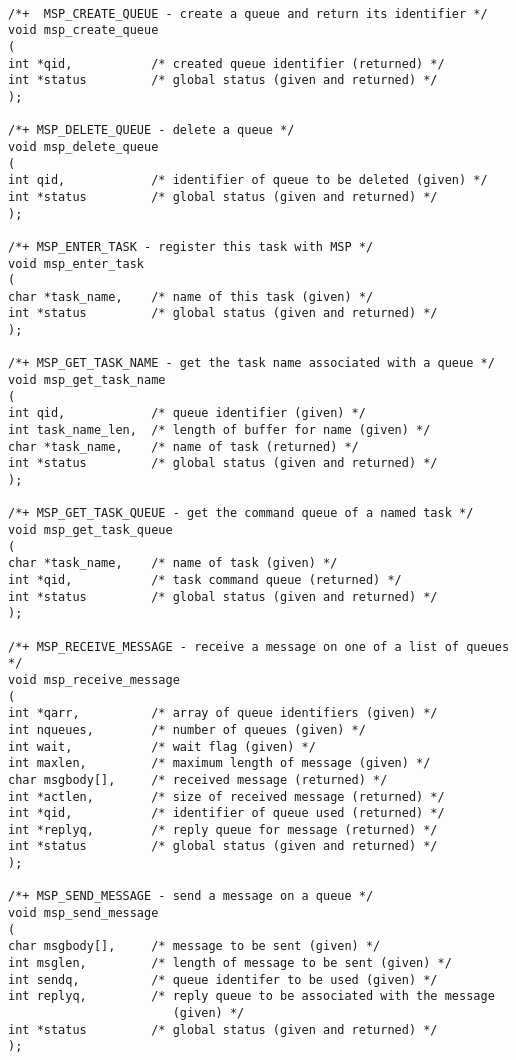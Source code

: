 \begin{verbatim}

/*+  MSP_CREATE_QUEUE - create a queue and return its identifier */
void msp_create_queue
(
int *qid,           /* created queue identifier (returned) */
int *status         /* global status (given and returned) */
);

/*+ MSP_DELETE_QUEUE - delete a queue */
void msp_delete_queue
(
int qid,            /* identifier of queue to be deleted (given) */
int *status         /* global status (given and returned) */
);

/*+ MSP_ENTER_TASK - register this task with MSP */
void msp_enter_task
(
char *task_name,    /* name of this task (given) */
int *status         /* global status (given and returned) */
);

/*+ MSP_GET_TASK_NAME - get the task name associated with a queue */
void msp_get_task_name
(
int qid,            /* queue identifier (given) */
int task_name_len,  /* length of buffer for name (given) */
char *task_name,    /* name of task (returned) */
int *status         /* global status (given and returned) */
);

/*+ MSP_GET_TASK_QUEUE - get the command queue of a named task */
void msp_get_task_queue
(
char *task_name,    /* name of task (given) */
int *qid,           /* task command queue (returned) */
int *status         /* global status (given and returned) */
);

/*+ MSP_RECEIVE_MESSAGE - receive a message on one of a list of queues */
void msp_receive_message
(
int *qarr,          /* array of queue identifiers (given) */
int nqueues,        /* number of queues (given) */
int wait,           /* wait flag (given) */
int maxlen,         /* maximum length of message (given) */
char msgbody[],     /* received message (returned) */
int *actlen,        /* size of received message (returned) */
int *qid,           /* identifier of queue used (returned) */
int *replyq,        /* reply queue for message (returned) */
int *status         /* global status (given and returned) */
);

/*+ MSP_SEND_MESSAGE - send a message on a queue */
void msp_send_message
(
char msgbody[],     /* message to be sent (given) */
int msglen,         /* length of message to be sent (given) */
int sendq,          /* queue identifer to be used (given) */
int replyq,         /* reply queue to be associated with the message
                       (given) */
int *status         /* global status (given and returned) */
);

\end{verbatim}


